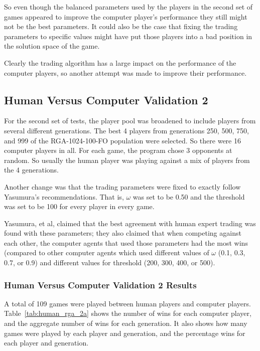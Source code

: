 So even though the balanced parameters used by the players in the second set of
games appeared to improve the computer player's performance they still might not
be the best parameters. It could also be the case that fixing the trading
parameters to specific values might have put those players into a bad position
in the solution space of the game.

Clearly the trading algorithm has a large impact on the performance of the 
computer players, so another attempt was made to improve their performance.

\subsection{Human Versus Computer Validation 2} \label{6_humanVRGA2}

For the second set of tests, the player pool was broadened to include players
from several different generations. The best 4 players from generations 250,
500, 750, and 999 of the RGA-1024-100-FO population were selected. So there were
16 computer players in all. For each game, the program chose 3 opponents at
random. So usually the human player was playing against a mix of players from
the 4 generations.

Another change was that the trading parameters were fixed to exactly follow
Yasumura's recommendations. That is, \(\omega\) was set to be 0.50 and the
threshold was set to be 100 for every player in every game.

Yasumura, et al, claimed that the best agreement with human expert trading was
found with these parameters; they also claimed that when competing against each
other, the computer agents that used those parameters had the most wins
(compared to other computer agents which used different values of \(\omega\)
(0.1, 0.3, 0.7, or 0.9) and different values for threshold (200, 300, 400, or
500).

\subsubsection{Human Versus Computer Validation 2 Results}

A total of 109 games were played between human players and computer players.
Table~\ref{tab:human_rga_2a} shows the number of wins for each computer player,
and the aggregate number of wins for each generation. It also shows how many
games were played by each player and generation, and the percentage wins for
each player and generation.


